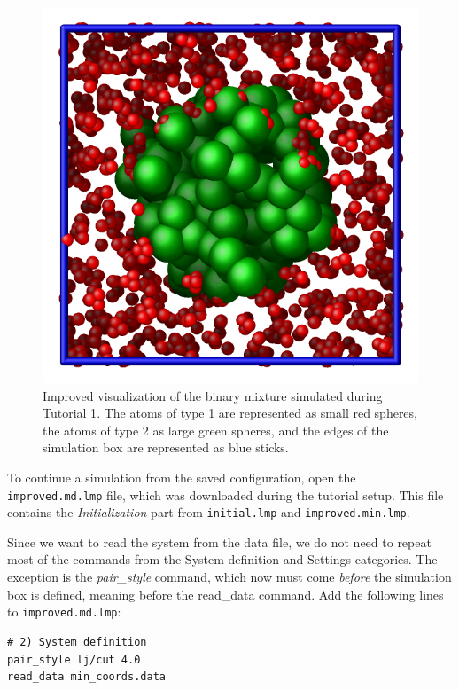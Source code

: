 \documentclass[9pt,tutorial]{livecoms}
\newcommand{\lmpcmd}[1]{\hspace{0pt}\colorbox{listing}{\textcolor{command}{\small{#1}}}\hspace{0pt}} %
\newcommand{\flecmd}[1]{\textcolor{command}{\texttt{#1}}} %
\begin{document}
\begin{figure}
\centering
\includegraphics[width=0.55\linewidth]{LJ-cylinder}
\caption{Improved visualization of the binary mixture simulated
during \hyperref[lennard-jones-label]{Tutorial 1}.  The atoms of type 1 are
represented as small red spheres, the atoms of type 2 as large green spheres,
and the edges of the simulation box are represented as blue sticks.}
\label{fig:improved-min}
\end{figure}

To continue a simulation from the saved configuration, open the
\flecmd{improved.md.lmp} file, which was downloaded during the tutorial setup.
This file contains the \textit{Initialization} part from \flecmd{initial.lmp}
and \flecmd{improved.min.lmp}.

Since we want to read the system from the data file, we do not need
to repeat most of the commands from the \lmpcmd{System definition}
and \lmpcmd{Settings} categories.  The exception is the \textit{pair\_style}
command, which now must come \emph{before} the simulation box is defined,
meaning before the \lmpcmd{read\_data} command.  Add the following
lines to \flecmd{improved.md.lmp}:
\begin{lstlisting}
# 2) System definition
pair_style lj/cut 4.0
read_data min_coords.data
\end{lstlisting}
\end{document}
